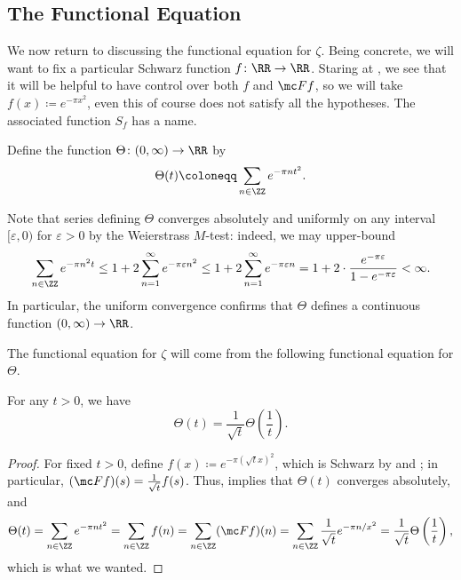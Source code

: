 \documentclass[../notes.tex]{subfiles}
\begin{document}
\subsection{The Functional Equation}
We now return to discussing the functional equation for $\zeta$. Being concrete, we will want to fix a particular Schwarz function $f\colon\RR\to\RR$. Staring at , we see that it will be helpful to have control over both $f$ and $\mc Ff$, so we will take $f(x)\coloneqq e^{-\pi x^2}$, even this of course does not satisfy all the hypotheses. The associated function $S_f$ has a name.
\begin{defihelper}[$\Gamma$] 
	Define the function $\Theta\colon(0,\infty)\to\RR$ by
	\[\Theta(t)\coloneqq\sum_{n\in\ZZ}e^{-\pi nt^2}.\]
\end{defihelper}
\begin{remark} \label{rem:theta-converges}
	Note that series defining $\Theta$ converges absolutely and uniformly on any interval $[\varepsilon,0)$ for $\varepsilon>0$ by the Weierstrass $M$-test: indeed, we may upper-bound
	\[\sum_{n\in\ZZ}e^{-\pi n^2t}\le1+2\sum_{n=1}^\infty e^{-\pi\varepsilon n^2}\le1+2\sum_{n=1}^\infty e^{-\pi\varepsilon n}=1+2\cdot\frac{e^{-\pi\varepsilon}}{1-e^{-\pi\varepsilon}}<\infty.\]
	In particular, the uniform convergence confirms that $\Theta$ defines a continuous function $(0,\infty)\to\RR$.
\end{remark}
The functional equation for $\zeta$ will come from the following functional equation for $\Theta$.
\begin{proposition} \label{prop:theta-func-eq}
	For any $t>0$, we have
	\[\Theta(t)=\frac1{\sqrt t}\Theta\left(\frac1t\right).\]
\end{proposition}
\begin{proof}
	For fixed $t>0$, define $f(x)\coloneqq e^{-\pi\left(\sqrt tx\right)^2}$, which is Schwarz by  and ; in particular, $(\mc Ff)(s)=\frac1{\sqrt t}f(s)$. Thus,  implies that $\Theta(t)$ converges absolutely, and
	\[\Theta(t)=\sum_{n\in\ZZ}e^{-\pi nt^2}=\sum_{n\in\ZZ}f(n)=\sum_{n\in\ZZ}(\mc Ff)(n)=\sum_{n\in\ZZ}\frac1{\sqrt t}e^{-\pi n/x^2}=\frac1{\sqrt t}\Theta\left(\frac1t\right),\]
	which is what we wanted.
\end{proof}
\end{document}
